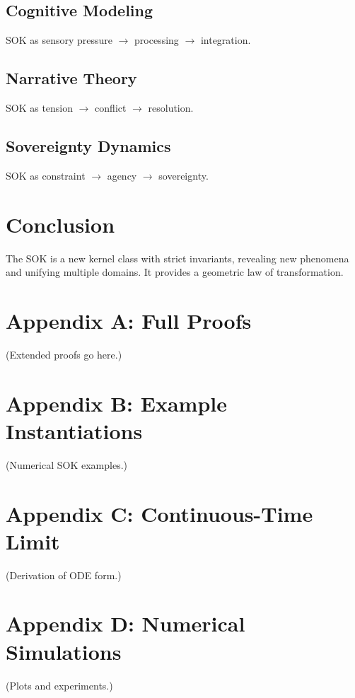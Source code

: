 \documentclass[11pt]{article}
\begin{document}
\subsection{Cognitive Modeling}
SOK as sensory pressure $\to$ processing $\to$ integration.

\subsection{Narrative Theory}
SOK as tension $\to$ conflict $\to$ resolution.

\subsection{Sovereignty Dynamics}
SOK as constraint $\to$ agency $\to$ sovereignty.

\section{Conclusion}

The SOK is a new kernel class with strict invariants, revealing new phenomena 
and unifying multiple domains. It provides a geometric law of transformation.

\appendix

\section{Appendix A: Full Proofs}
(Extended proofs go here.)

\section{Appendix B: Example Instantiations}
(Numerical SOK examples.)

\section{Appendix C: Continuous-Time Limit}
(Derivation of ODE form.)

\section{Appendix D: Numerical Simulations}
(Plots and experiments.)
\end{document}
